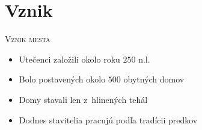 \documentclass[xcolor=dvipsnames]{beamer}
\begin{document}
\section{Vznik}
\begin{frame}{\textsc{Vznik mesta}}
\transwipe
	\begin{itemize}
	\item Utečenci založili okolo roku $250$ n.l.
	\item Bolo postavených okolo $500$ obytných domov
	\item Domy stavali len z~hlinených tehál
	\item Dodnes stavitelia pracujú podľa tradícii predkov
	\end{itemize}
	\begin{figure}[ht]
		\begin{center}
		\end{center}
	\end{figure}
\end{frame}

\end{document}
